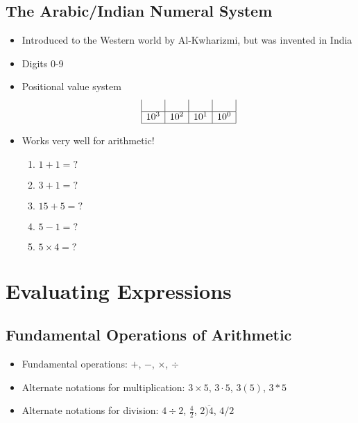 \documentclass{article}
\begin{document}
\subsection{The Arabic/Indian Numeral System}
\begin{itemize}
    \item Introduced to the Western world by Al-Kwharizmi, but was invented in India
    \item Digits 0-9
    \item Positional value system
    \[
    \begin{array}{|l|l|l|l|}
        & & & \\
        \hline
        10^3 & 10^2 & 10^1 & 10^0\\
        \hline
    \end{array}
    \]
    \item Works very well for arithmetic!
    \begin{enumerate}
    \item $1+1=?$
    \item $3+1=?$
    \item $15+5=?$
    \item $5-1=?$
    \item $5\times 4=?$
    \end{enumerate}
\end{itemize}

\section{Evaluating Expressions}
\subsection{Fundamental Operations of Arithmetic}
\begin{itemize}
\item Fundamental operations: $+$, $-$, $\times$, $\div$
\item Alternate notations for multiplication: $3\times 5$, $3\cdot 5$, $3(5)$, $3*5$
\item Alternate notations for division: $4\div 2$, $\frac{4}{2}$, $2\overline{)4}$, $4/2$
\end{itemize}
\end{document}
